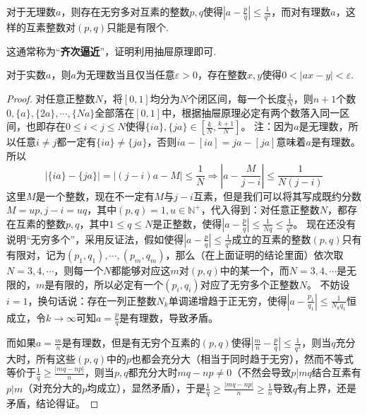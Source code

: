 \documentclass[lang=cn,newtx,10pt,scheme=chinese]{elegantbook}
\begin{document}
\begin{theorem}[狄利克雷定理]\label{theorem:狄利克雷定理}
对于无理数\(a\)，则存在无穷多对互素的整数\(p,q\)使得\(\left|a - \frac{p}{q}\right|\leq\frac{1}{q^2}\)，而对有理数\(a\)，这样的互素整数对\((p,q)\)只能是有限个.
\end{theorem}
\begin{note}
这通常称为“\textbf{齐次逼近}”，证明利用抽屉原理即可.
\end{note}

\begin{corollary}
对于实数\(a\)，则\(a\)为无理数当且仅当任意\(\varepsilon>0\)，存在整数\(x,y\)使得\(0 < |ax - y| < \varepsilon\).
\end{corollary}
\begin{proof}
对任意正整数\(N\)，将\([0,1]\)均分为\(N\)个闭区间，每一个长度\(\frac{1}{N}\)，则\(n + 1\)个数\(0,\{a\},\{2a\},\cdots,\{Na\}\)全部落在\([0,1]\)中，根据抽屉原理必定有两个数落入同一区间，也即存在\(0\leq i < j\leq N\)使得\(\{ia\},\{ja\}\in\left[\frac{k}{N},\frac{k + 1}{N}\right]\)。
注：因为\(a\)是无理数，所以任意\(i\neq j\)都一定有\(\{ia\}\neq\{ja\}\)，否则\(ia - [ia]=ja - [ja]\)意味着\(a\)是有理数。
所以
\[|\{ia\} - \{ja\}|=|(j - i)a - M|\leq\frac{1}{N}\Rightarrow\left|a - \frac{M}{j - i}\right|\leq\frac{1}{N(j - i)}\]
这里\(M\)是一个整数，现在不一定有\(M\)与\(j - i\)互素，但是我们可以将其写成既约分数\(M = up,j - i = uq\)，其中\((p,q)=1,u\in\mathbb{N}^+\)，代入得到：对任意正整数\(N\)，都存在互素的整数\(p,q\)，其中\(1\leq q\leq N\)是正整数，使得\(\left|a - \frac{p}{q}\right|\leq\frac{1}{Nq}\leq\frac{1}{q^2}\)。
现在还没有说明“无穷多个”，采用反证法，假如使得\(\left|a - \frac{p}{q}\right|\leq\frac{1}{q^2}\)成立的互素的整数\((p,q)\)只有有限对，记为\((p_1,q_1),\cdots,(p_m,q_m)\)，那么（在上面证明的结论里面）依次取\(N = 3,4,\cdots\)，则每一个\(N\)都能够对应这\(m\)对\((p,q)\)中的某一个，而\(N = 3,4,\cdots\)是无限的，\(m\)是有限的，所以必定有一个\((p_i,q_i)\)对应了无穷多个正整数\(N\)。
不妨设\(i = 1\)，换句话说：存在一列正整数\(N_k\)单调递增趋于正无穷，使得\(\left|a - \frac{p_1}{q_1}\right|\leq\frac{1}{N_kq_1}\)恒成立，令\(k\to\infty\)可知\(a = \frac{p}{q}\)是有理数，导致矛盾。

而如果\(a=\frac{m}{n}\)是有理数，但是有无穷个互素的\((p,q)\)使得\(\left|\frac{m}{n}-\frac{p}{q}\right|\leq\frac{1}{q^2}\)，则当\(q\)充分大时，所有这些\((p,q)\)中的\(p\)也都会充分大（相当于同时趋于无穷），然而不等式等价于\(\frac{1}{q}\geq\frac{|mq - np|}{n}\)，则当\(p,q\)都充分大时\(mq - np\neq0\)（不然会导致\(p|mq\)结合互素有\(p|m\)（对充分大的\(p\)均成立），显然矛盾），于是\(\frac{1}{q}\geq\frac{|mq - np|}{n}\geq\frac{1}{n}\)导致\(q\)有上界，还是矛盾，结论得证。
\end{proof}
\end{document}
